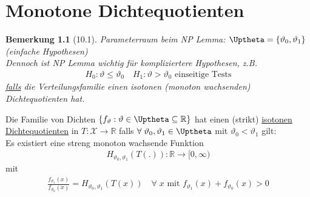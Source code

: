 \documentclass[a4paper,openany]{book}
\theoremstyle{mytheoremstyle}
\newtheorem*{bem}{Bemerkung}
\theoremstyle{mytheoremstyle2}
\begin{document}
\chapter{Monotone Dichtequotienten}
\begin{bem}[10.1]
  Parameterraum beim NP Lemma: $\Uptheta=\{\vartheta _0,\vartheta _1\}$ (einfache Hypothesen) \\
Dennoch ist NP Lemma wichtig für kompliziertere Hypothesen, z.B. 
\begin{align*}
  H_0:\vartheta \leq \vartheta _0\quad H_1:\vartheta >\vartheta _0 \text{ einseitige Tests}
\end{align*}
\underline{falls} die Verteilungsfamilie einen isotonen (monoton wachsenden) Dichtequotienten hat.
\end{bem}
\begin{defi}{10.2}{}
  Die Familie von Dichten $\{f _{\vartheta }:\vartheta \in \Uptheta \subseteq \mathbb{R}\} $ hat einen (strikt) \underline{isotonen Dichtequotienten} in $T:\mathcal{X}\to \mathbb{R}$ falls $\forall\;\vartheta _0,\vartheta _1 \in \Uptheta$ mit $\vartheta _0<\vartheta _1$ gilt: \\
  Es existiert eine streng monoton wachsende Funktion 
  \begin{align*}
    H _{\vartheta _0,\vartheta _1}(T(.)):\mathbb{R}\to[0,\infty )
  \end{align*}
  mit
  \begin{align*}
    \frac{f _{\vartheta _1}(x)}{f _{\vartheta _0}(x)}=H _{\vartheta _0,\vartheta _1}(T(x))\quad \forall\;x \text{ mit }f _{\vartheta _1}(x)+f _{\vartheta _0}(x)>0
  \end{align*}
\end{defi}
\end{document}
